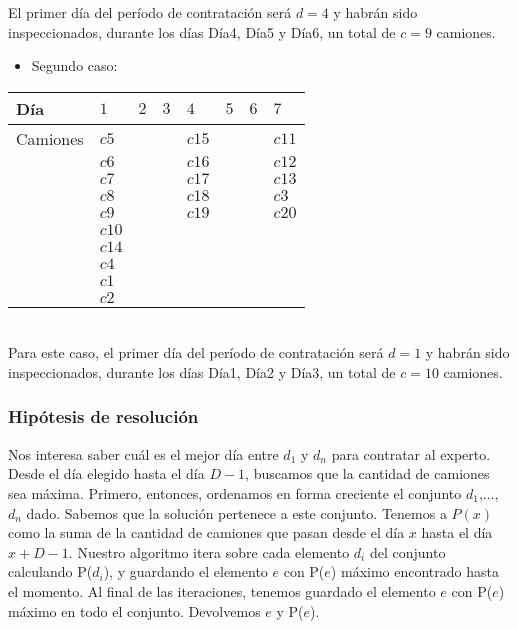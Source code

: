 \documentclass[11pt, a4paper, twoside]{article}
\begin{document}
El primer día del período de contratación será $d=4$ y habrán sido inspeccionados, durante los días Día4, Día5 y Día6, un total de $c=9$ camiones. \\

\begin{itemize}
	\item Segundo caso:
\end{itemize} 

\begin{tabular}{|l|l|l|l|l|l|l|l|}
	\hline
	Día          &  $1$  & $2$   & $3$   & $4$    & $5$ & $6$ & $7$   \\
	\hline
	Camiones     &  $c5$ &       &       & $c15$  &     &     & $c11$ \\
				 &  $c6$ &       &       & $c16$  &     &     & $c12$ \\    
				 &	$c7$ &       &       & $c17$  &     &     & $c13$ \\  
				 &	$c8$ &       &       & $c18$  &     &     & $c3$  \\
				 &	$c9$ &       &       & $c19$  &     &     & $c20$ \\
				 &	$c10$&       &       &        &     &     &       \\
				 &	$c14$&       &       &        &     &     &       \\
				 &	$c4$ &       &       &        &     &     &       \\
				 &	$c1$ &       &       &        &     &     &       \\
				 &	$c2$ &       &       &        &     &     &       \\
	\hline
\end{tabular} \\

Para este caso, el primer día del período de contratación será $d=1$ y habrán sido inspeccionados, durante los días Día1, Día2 y Día3, un total de $c=10$ camiones. 


\subsubsection{Hipótesis de resolución}

Nos interesa saber cuál es el mejor día entre $d_1$ y $d_n$ para contratar al experto. 
Desde el día elegido hasta el día $D - 1$, buscamos que la cantidad de camiones sea máxima.  
Primero, entonces, ordenamos en forma creciente el conjunto {$d_1$,...,$d_n$} dado.  
Sabemos que la solución pertenece a este conjunto. 
Tenemos a $P(x)$ como la suma de la cantidad de camiones que pasan desde el día $x$ hasta el día $x+D-1$.
Nuestro algoritmo itera sobre cada elemento $d_i$ del conjunto calculando P($d_i$), y guardando el elemento $e$ 
con P($e$) máximo encontrado hasta el momento. Al final de las iteraciones, tenemos guardado el elemento $e$ con 
P($e$) máximo en todo el conjunto. Devolvemos $e$ y P($e$).
\end{document}
